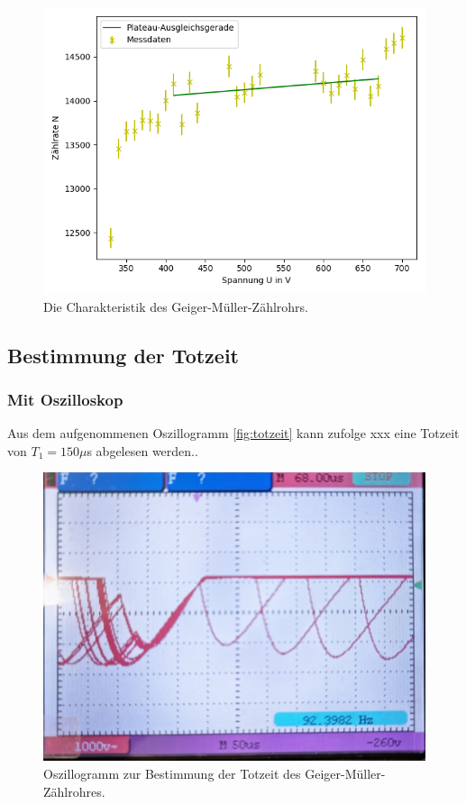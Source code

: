 \begin{figure}[H]
  \centering
  \includegraphics{content/figure_1_1.png}
  \caption{Die Charakteristik des Geiger-Müller-Zählrohrs.}
  \label{fig:charakteristik}
\end{figure}


\subsection{Bestimmung der Totzeit}
\subsubsection{Mit Oszilloskop}
Aus dem aufgenommenen Oszillogramm \autoref{fig:totzeit} kann zufolge xxx eine Totzeit von 
$T_1 = 150 \mu$s abgelesen werden..\\
\begin{figure}[H]
  \centering
  \includegraphics[width = \textwidth]{content/totzeit.jpg}
  \caption{Oszillogramm zur Bestimmung der Totzeit des Geiger-Müller-Zählrohres.}
  \label{fig:totzeit}
\end{figure}

